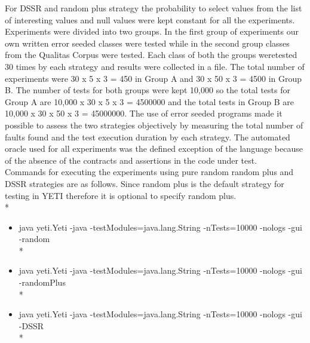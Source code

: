For DSSR and random plus strategy the probability to select values from the list of interesting values and null values were kept constant for all the experiments. Experiments were divided into two groups. In the first group of experiments our own written error seeded classes were tested while in the second group classes from the Qualitas Corpus were tested. Each class of both the groups weretested 30 times by each strategy and results were collected in a file. The total number of experiments were 30 x 5 x 3 = 450 in Group A and 30 x 50 x 3 = 4500 in Group B. The number of tests for both groups were kept 10,000 so the total tests for Group A are 10,000 x 30 x 5 x 3 = 4500000 and the total tests in Group B are 10,000 x 30 x 50 x 3 = 45000000.  The use of error seeded programs made it possible to assess the two strategies objectively by measuring the total number of faults found and the test execution duration by each strategy. The automated oracle used for all experiments was the defined exception of the language because of the absence of the contracts and assertions in the code under test.\\

Commands for executing the experiments using pure random random plus and DSSR strategies are as follows. Since random plus is the default strategy for testing in YETI therefore it is optional to specify random plus.\\*

\begin{itemize}

\item java yeti.Yeti -java -testModules=java.lang.String -nTests=10000 -nologs -gui -random\\*

\item java yeti.Yeti -java -testModules=java.lang.String -nTests=10000 -nologs -gui -randomPlus\\*

\item java yeti.Yeti -java -testModules=java.lang.String -nTests=10000 -nologs -gui -DSSR\\*

\end{itemize}

